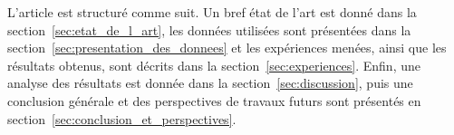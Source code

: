   L'article est structuré comme suit. Un bref état de l'art est donné dans la
  section~\ref{sec:etat_de_l_art}, les données utilisées sont présentées dans la
  section~\ref{sec:presentation_des_donnees} et les expériences menées, ainsi
  que les résultats obtenus, sont décrits dans la section~\ref{sec:experiences}.
  Enfin, une analyse des résultats est donnée dans la
  section~\ref{sec:discussion}, puis une conclusion générale et des perspectives
  de travaux futurs sont présentés en
  section~\ref{sec:conclusion_et_perspectives}.

